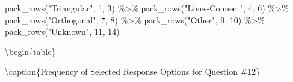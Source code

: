 \documentclass[
  letterpaper,
  DIV=11,
  numbers=noendperiod]{scrreprt}
\newenvironment{Shaded}{\begin{snugshade}}{\end{snugshade}}
\newcommand{\DecValTok}[1]{\textcolor[rgb]{0.68,0.00,0.00}{#1}}
\newcommand{\FunctionTok}[1]{\textcolor[rgb]{0.28,0.35,0.67}{#1}}
\newcommand{\NormalTok}[1]{\textcolor[rgb]{0.00,0.23,0.31}{#1}}
\newcommand{\SpecialCharTok}[1]{\textcolor[rgb]{0.37,0.37,0.37}{#1}}
\newcommand{\StringTok}[1]{\textcolor[rgb]{0.13,0.47,0.30}{#1}}
\begin{document}
\begin{Shaded}
\begin{Highlighting}[]
  \FunctionTok{pack\_rows}\NormalTok{(}\StringTok{"Triangular"}\NormalTok{, }\DecValTok{1}\NormalTok{, }\DecValTok{3}\NormalTok{) }\SpecialCharTok{\%\textgreater{}\%}
  \FunctionTok{pack\_rows}\NormalTok{(}\StringTok{"Lines{-}Connect"}\NormalTok{, }\DecValTok{4}\NormalTok{, }\DecValTok{6}\NormalTok{) }\SpecialCharTok{\%\textgreater{}\%}
  \FunctionTok{pack\_rows}\NormalTok{(}\StringTok{"Orthogonal"}\NormalTok{, }\DecValTok{7}\NormalTok{, }\DecValTok{8}\NormalTok{) }\SpecialCharTok{\%\textgreater{}\%}
  \FunctionTok{pack\_rows}\NormalTok{(}\StringTok{"Other"}\NormalTok{, }\DecValTok{9}\NormalTok{, }\DecValTok{10}\NormalTok{) }\SpecialCharTok{\%\textgreater{}\%}
  \FunctionTok{pack\_rows}\NormalTok{(}\StringTok{"Unknown"}\NormalTok{, }\DecValTok{11}\NormalTok{, }\DecValTok{14}\NormalTok{)}
\end{Highlighting}
\end{Shaded}

\textbackslash begin\{table\}

\textbackslash caption\{\label{tab:Q12-RESPONSES}Frequency of Selected
Response Options for Question \#12\} \centering
\end{document}
